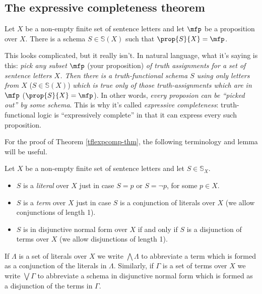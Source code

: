 \subsection{The expressive completeness theorem}

\begin{theorem}\label{tflexpcomp-thm}
Let $X$ be a non-empty finite set of sentence letters and let $\mfp$ be a proposition over $X$. There is a schema $S\in\mathbb{S}(X)$ such that $\prop{S}{X}=\mfp$.
\end{theorem}

\begin{aside}
    This looks complicated, but it really isn't. In natural language, what it's saying is this: \emph{pick any subset $\mfp$} (your proposition) \emph{of truth assignments for a set of sentence letters $X$. Then there is a truth-functional schema $S$ using only letters from $X$} ($S\in\mathbb{S}(X)$) \emph{which is true only of those truth-assignments which are in $\mfp$} ($\prop{S}{X}=\mfp$). In other words, \emph{every proposion can be ``picked out'' by some schema}. This is why it's called \emph{expressive completeness}: truth-functional logic is ``expressively complete'' in that it can express every such proposition. 
\end{aside}

For the proof of Theorem \ref{tflexpcomp-thm}, the following terminology and lemma will be useful. 
\begin{definition}
Let $X$ be a non-empty finite set of sentence letters and let $S\in\mathbb{S}_X$.
\begin{itemize}
\item $S$ is a \emph{literal} over $X$ just in case $S = p$ or $S = \neg p$, for some $p\in X$.
\item $S$ is a \emph{term} over $X$ just in case $S$ is a conjunction of literals over $X$ (we allow conjunctions of length 1).
\item $S$ is in disjunctive normal form over $X$ if and only if $S$ is a disjunction of terms over $X$ (we allow disjunctions of length 1). 
\end{itemize}
\end{definition}
If $\Lambda$ is a set of literals over $X$ we write $\bigwedge \Lambda$ to abbreviate a term which is formed as a conjunction of the literals in $\Lambda$. Similarly, if $\Gamma$ is a set of terms over $X$ we write $\bigvee\Gamma$ to abbreviate a schema in disjunctive normal form which is formed as a disjunction of the terms in $\Gamma$.

